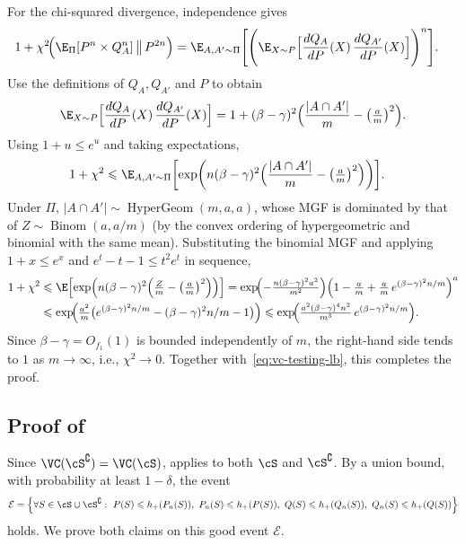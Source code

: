 \documentclass[english]{article}
\theoremstyle{plain}
\theoremstyle{definition}
\DeclareMathOperator{\HyperGeom}{HyperGeom}
\DeclareMathOperator{\Binom}{Binom}
\newcommand{\falt}{f_1}
\newcommand{\hup}{h_+}                             %
\begin{document}
For the chi-squared divergence, independence gives
\begin{align*}
1 + \chi^2\!\Bigl(\E_\Pi[P^n \times Q_A^n] \,\big\|\, P^{2n}\Bigr)
&= \E_{A,A' \sim \Pi}\Biggl[
\Biggl(\E_{X \sim P}\Bigl[
\frac{dQ_A}{dP}(X)\,\frac{dQ_{A'}}{dP}(X)
\Bigr]\Biggr)^{n}
\Biggr].
\end{align*}
Use the definitions of $Q_A, Q_{A'}$ and $P$ to obtain
\[
\E_{X \sim P}\Bigl[
\frac{dQ_A}{dP}(X)\,\frac{dQ_{A'}}{dP}(X)\Bigr]
= 1 + (\beta - \gamma)^2
\Bigl(\frac{|A \cap A'|}{m} - \bigl(\tfrac{a}{m}\bigr)^2\Bigr).
\]
Using $1 + u \leqslant e^u$ and taking expectations,
\begin{align*}
1 + \chi^2
&\leqslant \E_{A,A' \sim \Pi}\biggl[
\exp\biggl(
n(\beta - \gamma)^2\Bigl(
\frac{|A \cap A'|}{m} - \bigl(\tfrac{a}{m}\bigr)^2
\Bigr)
\biggr)\biggr].
\end{align*}
Under $\Pi$, $|A\cap A'|\sim\HyperGeom(m,a,a)$, whose MGF is dominated by that of $Z\sim\Binom(a,a/m)$ (by the convex ordering of hypergeometric and binomial with the same mean). Substituting the binomial MGF and applying $1+x\leqslant e^x$ and $e^t-t-1\leqslant t^2e^t$ in sequence,
\begin{align*}
1 + \chi^2
&\leqslant \E\!\left[\exp\!\left(n(\beta-\gamma)^2\Bigl(\tfrac{Z}{m}-\bigl(\tfrac{a}{m}\bigr)^2\Bigr)\right)\right]
= \exp\!\Bigl(-\tfrac{n(\beta-\gamma)^2 a^2}{m^2}\Bigr)\Bigl(1-\tfrac{a}{m}+\tfrac{a}{m}\,e^{(\beta-\gamma)^2 n/m}\Bigr)^{a}\\
&\leqslant \exp\!\Bigl(\tfrac{a^2}{m}\bigl(e^{(\beta-\gamma)^2 n/m}-(\beta-\gamma)^2 n/m-1\bigr)\Bigr)
\leqslant \exp\!\Bigl(\tfrac{a^2(\beta-\gamma)^4n^2}{m^3}\,e^{(\beta-\gamma)^2n/m}\Bigr).
\end{align*}
Since $\beta-\gamma=O_{\falt}(1)$ is bounded independently of $m$, the right-hand side tends to $1$ as $m\to\infty$, i.e., $\chi^2\to 0$. Together with~\eqref{eq:vc-testing-lb}, this completes the proof.


\subsection{Proof of }
\label{sec:proof-general}


Since \(\VC(\cS^\complement)=\VC(\cS)\),  applies to both
\(\cS\) and \(\cS^\complement\). By a union bound, with probability at least
\(1-\delta\), the event
\[
\mathcal E
=
\Bigl\{
\forall S\in \cS\cup\cS^\complement:\ 
P(S)\leqslant \hup(P_n(S)),\ 
P_n(S)\leqslant \hup(P(S)),\ 
Q(S)\leqslant \hup(Q_n(S)),\ 
Q_n(S)\leqslant \hup(Q(S))
\Bigr\}
\]
holds.
We prove both claims on this good event \(\mathcal E\).
\end{document}
